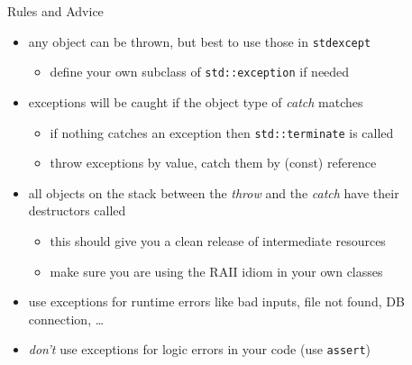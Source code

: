 \begin{frame}[fragile]
  \begin{block}{Rules and Advice}
    \begin{itemize}
      \item any object can be thrown, but best to use those in \texttt{stdexcept}
      \begin{itemize}
        \item define your own subclass of \texttt{std::exception} if needed
      \end{itemize}
      \item exceptions will be caught if the object type of \textit{catch} matches
      \begin{itemize}
          \item if nothing catches an exception then \texttt{std::terminate} is called
          \item throw exceptions by value, catch them by (const) reference
      \end{itemize}
      \item all objects on the stack between the \textit{throw} and the \textit{catch} have their destructors called
      \begin{itemize}
        \item this should give you a clean release of intermediate resources
        \item make sure you are using the RAII idiom in your own classes
      \end{itemize}
      \item use exceptions for runtime errors like bad inputs, file not found, DB connection, \ldots
      \item \textit{don't} use exceptions for logic errors in your code (use \texttt{assert})
    \end{itemize}
  \end{block}
\end{frame}

